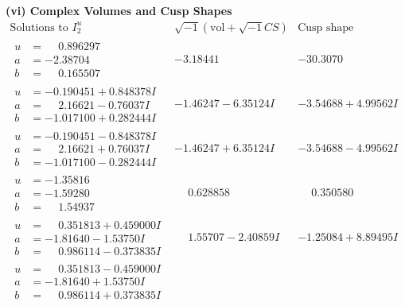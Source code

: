 \documentclass[1p]{elsarticle_modified}
\theoremstyle{definition}
\newcommand{\I}{\sqrt{-1}}
\begin{document}
\newpage\flushleft \textbf{(vi) Complex Volumes and Cusp Shapes}
$$\begin{array}{c|c|c}  
\text{Solutions to }I^u_{2}& \I (\text{vol} + \sqrt{-1}CS) & \text{Cusp shape}\\
 \hline 
\begin{aligned}
u &= \phantom{-}0.896297\phantom{ +0.000000I} \\
a &= -2.38704\phantom{ +0.000000I} \\
b &= \phantom{-}0.165507\phantom{ +0.000000I}\end{aligned}
 & -3.18441\phantom{ +0.000000I} & -30.3070\phantom{ +0.000000I} \\ \hline\begin{aligned}
u &= -0.190451 + 0.848378 I \\
a &= \phantom{-}2.16621 - 0.76037 I \\
b &= -1.017100 + 0.282444 I\end{aligned}
 & -1.46247 - 6.35124 I & -3.54688 + 4.99562 I \\ \hline\begin{aligned}
u &= -0.190451 - 0.848378 I \\
a &= \phantom{-}2.16621 + 0.76037 I \\
b &= -1.017100 - 0.282444 I\end{aligned}
 & -1.46247 + 6.35124 I & -3.54688 - 4.99562 I \\ \hline\begin{aligned}
u &= -1.35816\phantom{ +0.000000I} \\
a &= -1.59280\phantom{ +0.000000I} \\
b &= \phantom{-}1.54937\phantom{ +0.000000I}\end{aligned}
 & \phantom{-}0.628858\phantom{ +0.000000I} & \phantom{-}0.350580\phantom{ +0.000000I} \\ \hline\begin{aligned}
u &= \phantom{-}0.351813 + 0.459000 I \\
a &= -1.81640 - 1.53750 I \\
b &= \phantom{-}0.986114 - 0.373835 I\end{aligned}
 & \phantom{-}1.55707 - 2.40859 I & -1.25084 + 8.89495 I \\ \hline\begin{aligned}
u &= \phantom{-}0.351813 - 0.459000 I \\
a &= -1.81640 + 1.53750 I \\
b &= \phantom{-}0.986114 + 0.373835 I\end{aligned}

\end{array}$$
\end{document}
